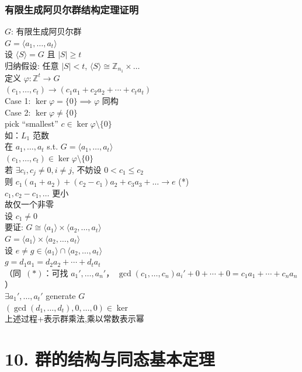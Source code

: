 \documentclass[12pt, a4paper]{article}
\begin{document}
\subsubsection*{有限生成阿贝尔群结构定理证明}
$G$: 有限生成阿贝尔群 \\
$G = \langle a_1, \dots, a_t \rangle$ \\
设 $\langle S \rangle = G$ 且 $|S| \geq t$ \\
归纳假设: 任意 $|S| < t$, $\langle S \rangle \cong \mathbb{Z}_{n_1} \times \dots$ \\
定义 $\varphi: \mathbb{Z}^t \to G$ \\
$(c_1, \dots, c_t) \to (c_1 a_1 + c_2 a_2 + \cdots + c_t a_t)$ \\
Case 1: $\ker \varphi = \{0\} \implies \varphi$ 同构 \checkmark{} \\
Case 2: $\ker \varphi \neq \{0\}$ \\
pick ``smallest'' $c \in \ker \varphi \setminus \{0\}$ \\
如：$L_1$ 范数 \\
在 $a_1, \dots, a_t$ s.t. $G = \langle a_1, \dots, a_t \rangle$ \\
$(c_1, \dots, c_t) \in \ker \varphi \setminus \{0\}$ \\
若 $\exists c_i, c_j \neq 0, i \neq j$, 不妨设 $0 < c_1 \leq c_2$ \\
则 $c_1(a_1 + a_2) + (c_2 - c_1)a_2 + c_3 a_3 + \dots \to e$ \quad (*) \\
$c_1, c_2 - c_1, \dots$ 更小 \\
故仅一个非零 \\
设 $c_1 \neq 0$ \\
要证: $G \cong \langle a_1 \rangle \times \langle a_2, \dots, a_t \rangle$ \\
$G = \langle a_1 \rangle \times \langle a_2, \dots, a_t \rangle$ \\
设 $e \neq g \in \langle a_1 \rangle \cap \langle a_2, \dots, a_t \rangle$ \\
$g = d_1 a_1 = d_2 a_2 + \cdots + d_t a_t$ \\
（同~$(*)$：可找 $a_1', \dots, a_n'$，
$\gcd(c_1, \dots, c_n) a_i' + 0 + \cdots + 0 = c_1 a_1 + \cdots + c_n a_n$） \\
$\exists a_1', \dots, a_t'$ generate $G$ \\
$(\gcd(d_1, \dots, d_t), 0, \dots, 0) \in \ker$ \\
上述过程+表示群乘法,乘以常数表示幂

\section*{10. 群的结构与同态基本定理}
\end{document}
